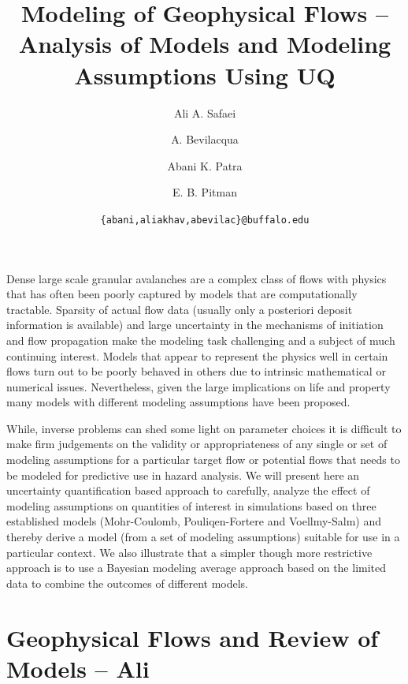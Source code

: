 \documentclass{article}
\begin{document}
\title{\bf Modeling of Geophysical Flows -- Analysis of Models and Modeling Assumptions Using UQ}
\author[1]{ Ali A. Safaei}
\author[2]{A. Bevilacqua}
\author[1,3]{Abani K. Patra}
\author[4]{E. B. Pitman}


\date{\texttt{\{abani,aliakhav,abevilac\}@buffalo.edu}}


\maketitle

\abstract
Dense large scale granular avalanches are a complex class of flows with physics that has often been poorly captured by models that are computationally tractable. Sparsity of actual flow data (usually only a posteriori  deposit information is available) and large uncertainty in the mechanisms of initiation and flow propagation make the modeling task challenging and a
subject of much continuing interest. Models that appear to represent the physics well
 in certain flows turn out to be poorly behaved in others due to intrinsic mathematical or numerical issues.
Nevertheless, given the large implications on life and property many models with different modeling assumptions have been proposed.

While, inverse problems can shed some light on parameter choices it is difficult to make firm judgements on the validity or appropriateness of any single or set of modeling assumptions for a particular target flow or potential flows that needs to be modeled for predictive use in hazard analysis. We will present here an uncertainty quantification  based approach to carefully, analyze the effect of modeling assumptions on quantities of
interest in simulations based on three established models (Mohr-Coulomb, Pouliqen-Fortere and Voellmy-Salm) and thereby derive a model (from a set of modeling assumptions) suitable for use in a particular context. We also illustrate that a simpler though more restrictive approach is to use a Bayesian modeling average approach based on the limited data to combine the outcomes of different models.

\newpage
\section{Geophysical Flows and Review of Models -- Ali}\label{sec:GeoPhFlows}
\end{document}
